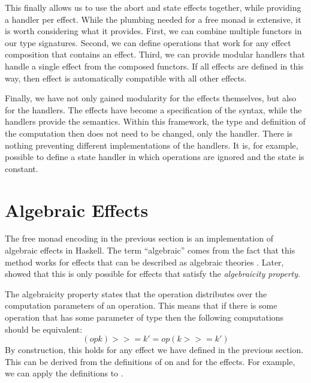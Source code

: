 This finally allows us to use the abort and state effects together, while providing a handler per effect. While the plumbing needed for a free monad is extensive, it is worth considering what it provides. First, we can combine multiple functors in our type signatures. Second, we can define operations that work for any effect composition that contains an effect. Third, we can provide modular handlers that handle a single effect from the composed functors. If all effects are defined in this way, then effect is automatically compatible with all other effects.

Finally, we have not only gained modularity for the effects themselves, but also for the handlers. The effects have become a specification of the syntax, while the handlers provide the semantics. Within this framework, the type and definition of the computation then does not need to be changed, only the handler. There is nothing preventing different implementations of the handlers. It is, for example, possible to define a state handler in which  operations are ignored and the state is constant.

\section{Algebraic Effects}

The free monad encoding in the previous section is an implementation of algebraic effects in Haskell. The term ``algebraic'' comes from the fact that this method works for effects that can be described as algebraic theories \autocite{goos_adequacy_2001}. Later, \textcite{plotkin_algebraic_2003} showed that this is only possible for effects that satisfy the \emph{algebraicity property}.

The algebraicity property states that the \hs{>>=} operation distributes over the computation parameters of an operation. This means that if there is some operation  that has some parameter of type  then the following computations should be equivalent:
\[ (op k) >>= k'  =   op (k >>= k') \] 
By construction, this holds for any effect we have defined in the previous section. This can be derived from the definitions of \hs{>>=} on  and  for the effects. For example, we can apply the definitions to .


